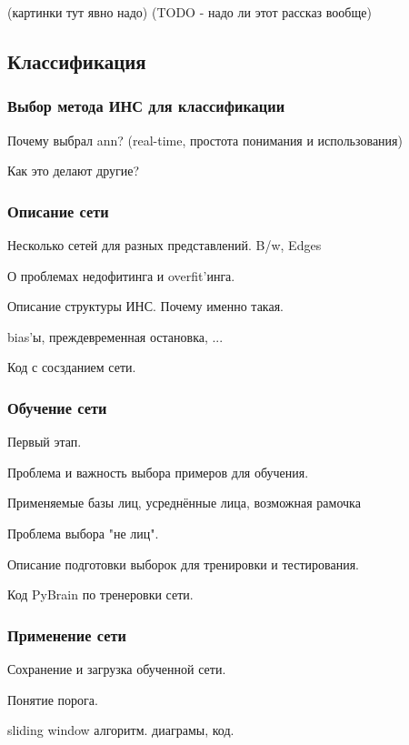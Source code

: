 \documentclass[12pt]{report}
\begin{document}
(картинки тут явно надо)
(TODO - надо ли этот рассказ вообще)

\subsection{Классификация}

\subsubsection{Выбор метода ИНС для классификации}
Почему выбрал ann? (real-time, простота понимания и использования)

Как это делают другие?
\subsubsection{Описание сети}
Несколько сетей для разных представлений. B/w, Edges

О проблемах недофитинга и overfit'инга.

Описание структуры ИНС. Почему именно такая.

bias'ы, преждевременная остановка, ...

Код с сосзданием сети.
\subsubsection{Обучение сети}
Первый этап.

Проблема и важность выбора примеров для обучения.

Применяемые базы лиц, усреднённые лица, возможная рамочка

Проблема выбора "не лиц".

Описание подготовки выборок для тренировки и тестирования.

Код PyBrain по тренеровки сети.
\subsubsection{Применение сети}
Сохранение и загрузка обученной сети.

Понятие порога.

sliding window алгоритм. диаграмы, код.
\end{document}
